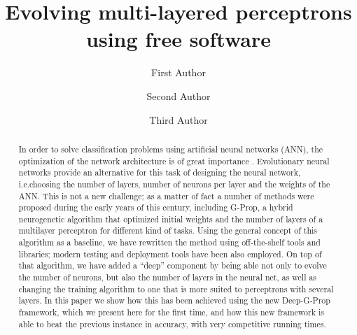 \documentclass[runningheads]{llncs}
\begin{document}
%
\title{Evolving multi-layered perceptrons using free software}
%
%
\author{First Author \and
Second Author \and
Third Author}
%
%
%
\maketitle              %

\begin{abstract}

In order to solve classification problems using artificial neural
networks (ANN), the optimization of the network architecture is 
of great importance . Evolutionary neural networks provide an
alternative for this task of designing the neural network, i.e.choosing the
number of layers, number of neurons per layer and the weights of the
ANN. This is not a new challenge; as a matter of fact a number of
methods were proposed during the early years of this century,
including G-Prop, a hybrid neurogenetic algorithm that optimized
initial weights and the number of layers of a multilayer perceptron for
different kind of tasks. Using the general concept of this algorithm
as a baseline, we have rewritten the method using off-the-shelf tools
and libraries; modern testing and deployment tools have been also
employed. On top of that algorithm, we have added a ``deep'' component
by being able not only to evolve the number of neurons, but also the
number of layers in the neural net, as well as changing the training
algorithm to one that is more suited to perceptrons with several
layers. In this paper we show how this has
been achieved using the new Deep-G-Prop framework, which we present
here for the first time, and how this new framework is able to beat the
previous instance in accuracy, with very competitive running times.


\end{abstract}
\end{document}
